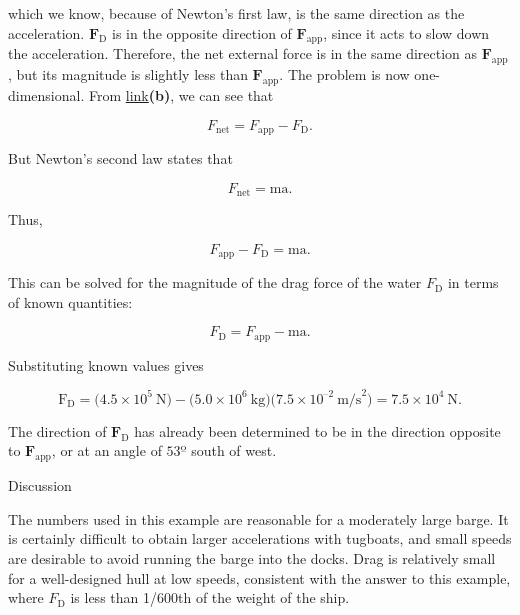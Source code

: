 \documentclass[
]{book}
\newenvironment{tinysection}{}{}
\begin{document}
which we know, because of Newton's first law, is the same direction as
the acceleration. \(\textbf{F}_{\text{D}}{}\) is in the opposite direction
of \(\textbf{F}_{\text{app}}{}\), since it acts to slow down the
acceleration. Therefore, the net external force is in the same direction
as \(\textbf{F}_{\text{app}}{}\), but its magnitude is slightly less than
\(\textbf{F}_{\text{app}}{}\). The problem is now one-dimensional. From
\protect\hyperlink{import-auto-id1221020}{link}\textbf{(b)}, we can
see that

\leavevmode\hypertarget{eip-id1624544}{}%
\[{F_{\text{net}} = {F_{\text{app}} - F_{\text{D}}}}.\]

But Newton's second law states that

\leavevmode\hypertarget{eip-id1230866}{}%
\[{F_{\text{net}} = \text{ma}}.\]

Thus,

\leavevmode\hypertarget{eip-id2268355}{}%
\[{{F_{\text{app}} - F_{\text{D}}} = \text{ma}}.\]

This can be solved for the magnitude of the drag force of the water
\(F_{\text{D}}{}\) in terms of known quantities:

\leavevmode\hypertarget{eip-id1464099}{}%
\[{F_{\text{D}} = {F_{\text{app}} - \text{ma}}}.\]

Substituting known values gives

\leavevmode\hypertarget{eip-id1715978}{}%
\[{{\text{F}_{\text{D}} = (}4\text{.}{\text{5} \times \text{10}^{5}}\ \text{N}{) - (}5\text{.}{\text{0} \times \text{10}^{6}}\ \text{kg})(7\text{.}{\text{5} \times \text{10}^{\text{–2}}}\ \text{m/s}^{2}{) = 7}\text{.}{\text{5} \times \text{10}^{4}}\ \text{N}}.\]

The direction of \(\textbf{F}_{\text{D}}{}\) has already been determined
to be in the direction opposite to \(\textbf{F}_{\text{app}}{}\), or at an
angle of \(\text{53º}{}\) south of west.

\begin{tinysection}

{Discussion}

\end{tinysection}

The numbers used in this example are reasonable for a moderately large
barge. It is certainly difficult to obtain larger accelerations with
tugboats, and small speeds are desirable to avoid running the barge into
the docks. Drag is relatively small for a well-designed hull at low
speeds, consistent with the answer to this example, where
\(F_{\text{D}}{}\) is less than 1/600th of the weight of the ship.
\end{document}
